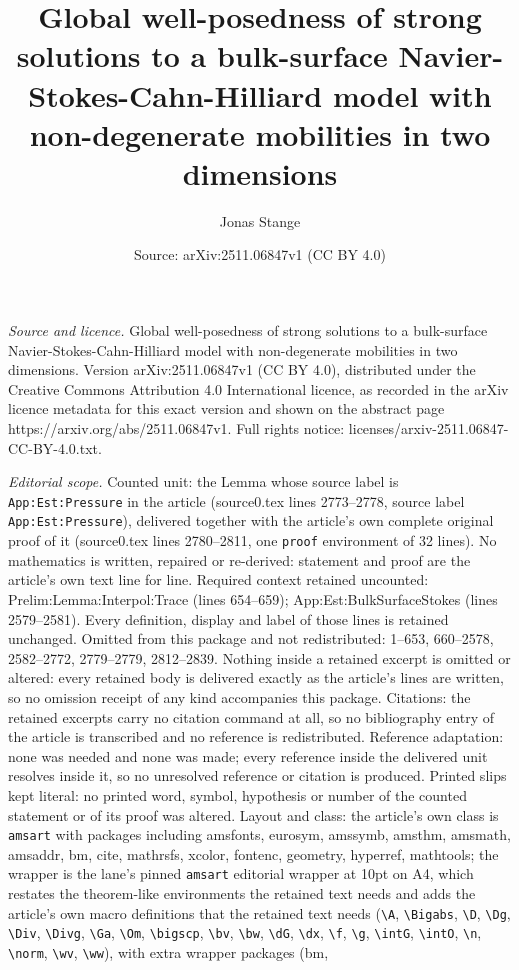 \documentclass[10pt,a4paper]{amsart}
\title[Global well-posedness of strong solutions to a bulk-surface ]{Global well-posedness of strong solutions to a bulk-surface Navier-Stokes-Cahn-Hilliard model with non-degenerate mobilities in two dimensions}
\author{Jonas Stange}
\date{Source: arXiv:2511.06847v1 (CC BY 4.0)}
\begin{document}
\maketitle

\noindent\emph{Source and licence.} Global well-posedness of strong solutions to a bulk-surface Navier-Stokes-Cahn-Hilliard model with non-degenerate mobilities in two dimensions. Version arXiv:2511.06847v1 (CC BY 4.0), distributed under the Creative Commons Attribution 4.0 International licence, as recorded in the arXiv licence metadata for this exact version and shown on the abstract page https://arxiv.org/abs/2511.06847v1. Full rights notice: licenses/arxiv-2511.06847-CC-BY-4.0.txt.\par\smallskip

\noindent\textit{Editorial scope.} Counted unit: the Lemma whose source label is \texttt{App:Est:Pressure} in the article (source0.tex lines 2773--2778, source label \texttt{App:Est:Pressure}), delivered together with the article's own complete original proof of it (source0.tex lines 2780--2811, one \texttt{proof} environment of 32 lines). No mathematics is written, repaired or re-derived: statement and proof are the article's own text line for line. Required context retained uncounted: Prelim:Lemma:Interpol:Trace (lines 654--659); App:Est:BulkSurfaceStokes (lines 2579--2581). Every definition, display and label of those lines is retained unchanged. Omitted from this package and not redistributed: 1--653, 660--2578, 2582--2772, 2779--2779, 2812--2839. Nothing inside a retained excerpt is omitted or altered: every retained body is delivered exactly as the article's lines are written, so no omission receipt of any kind accompanies this package. Citations: the retained excerpts carry no citation command at all, so no bibliography entry of the article is transcribed and no reference is redistributed. Reference adaptation: none was needed and none was made; every reference inside the delivered unit resolves inside it, so no unresolved reference or citation is produced. Printed slips kept literal: no printed word, symbol, hypothesis or number of the counted statement or of its proof was altered. Layout and class: the article's own class is \texttt{amsart} with packages including amsfonts, eurosym, amssymb, amsthm, amsmath, amsaddr, bm, cite, mathrsfs, xcolor, fontenc, geometry, hyperref, mathtools; the wrapper is the lane's pinned \texttt{amsart} editorial wrapper at 10pt on A4, which restates the theorem-like environments the retained text needs and adds the article's own macro definitions that the retained text needs (\texttt{\textbackslash A}, \texttt{\textbackslash Bigabs}, \texttt{\textbackslash D}, \texttt{\textbackslash Dg}, \texttt{\textbackslash Div}, \texttt{\textbackslash Divg}, \texttt{\textbackslash Ga}, \texttt{\textbackslash Om}, \texttt{\textbackslash bigscp}, \texttt{\textbackslash bv}, \texttt{\textbackslash bw}, \texttt{\textbackslash dG}, \texttt{\textbackslash dx}, \texttt{\textbackslash f}, \texttt{\textbackslash g}, \texttt{\textbackslash intG}, \texttt{\textbackslash intO}, \texttt{\textbackslash n}, \texttt{\textbackslash norm}, \texttt{\textbackslash wv}, \texttt{\textbackslash ww}), with extra wrapper packages (bm, 
\end{document}
